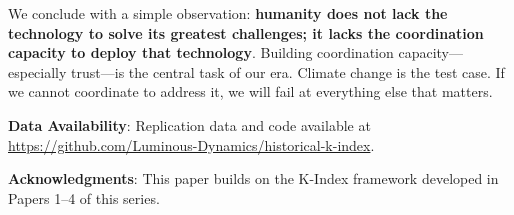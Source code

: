 \documentclass[12pt,a4paper]{article}
\begin{document}
We conclude with a simple observation: \textbf{humanity does not lack the technology to solve its greatest challenges; it lacks the coordination capacity to deploy that technology}. Building coordination capacity---especially trust---is the central task of our era. Climate change is the test case. If we cannot coordinate to address it, we will fail at everything else that matters.

\vspace{1em}
\noindent\textbf{Data Availability}: Replication data and code available at \url{https://github.com/Luminous-Dynamics/historical-k-index}.

\vspace{1em}
\noindent\textbf{Acknowledgments}: This paper builds on the K-Index framework developed in Papers 1--4 of this series.



\end{document}
